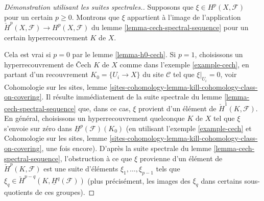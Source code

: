\begin{proof}[Démonstration utilisant les suites spectrales.]
Supposons que $\xi \in H^p(X, \mathcal{F})$ pour un certain $p \geq 0$.
Montrons que $\xi$ appartient à l'image de l'application
$\check{H}^p(X, \mathcal{F}) \to H^p(X, \mathcal{F})$ du
lemme \ref{lemma-cech-spectral-sequence}
pour un certain hyperrecouvrement $K$ de $X$.

\medskip\noindent
Cela est vrai si $p = 0$ par le lemme \ref{lemma-h0-cech}.
Si $p = 1$, choisissons un hyperrecouvrement de {\v C}ech $K$ de $X$ comme dans
l'exemple \ref{example-cech}, en partant d'un recouvrement
$K_0 = \{U_i \to X\}$ du site $\mathcal{C}$ tel que
$\xi|_{U_i} = 0$, voir
Cohomologie sur les sites,
lemme \ref{sites-cohomology-lemma-kill-cohomology-class-on-covering}.
Il résulte immédiatement de la suite spectrale
du lemme \ref{lemma-cech-spectral-sequence} que, dans ce cas, $\xi$ provient
d'un élément de $\check{H}^1(K, \mathcal{F})$.
En général, choisissons un hyperrecouvrement quelconque $K$ de $X$ tel
que $\xi$ s'envoie sur zéro dans $\underline{H}^p(\mathcal{F})(K_0)$
(en utilisant l'exemple \ref{example-cech} et
Cohomologie sur les sites,
lemme \ref{sites-cohomology-lemma-kill-cohomology-class-on-covering},
une fois encore).
D'après la suite spectrale du lemme \ref{lemma-cech-spectral-sequence},
l'obstruction à ce que $\xi$ provienne d'un élément de
$\check{H}^p(K, \mathcal{F})$ est une suite d'éléments
$\xi_1, \ldots, \xi_{p - 1}$ tels que
$\xi_q \in \check{H}^{p - q}(K, \underline{H}^q(\mathcal{F}))$
(plus précisément, les images des $\xi_q$ dans certains sous-quotients
de ces groupes).


\end{proof}
